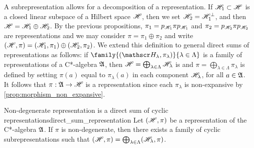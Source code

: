 A subrepresentation allows for a decomposition of a representation. If \(\mathscr{H}_1 \subset \mathscr{H}\) is a closed linear subspace of a Hilbert space \(\mathscr{H}\), then we set \(\mathscr{H}_2 = \mathscr{H}_1^{\perp}\), and then \(\mathscr{H} = \mathscr{H}_1 \oplus \mathscr{H}_2\). By the previous propositions, \(\pi_1 = p_{\mathscr{H}_1} \pi p_{\mathscr{H}_1}\) and \(\pi_2 = p_{\mathscr{H}_2} \pi p_{\mathscr{H}_2}\) are representations and we may consider \(\pi = \pi_1 \oplus \pi_2\) and write \((\mathscr{H}, \pi) = (\mathscr{H}_1, \pi_1) \oplus (\mathscr{H}_2, \pi_2)\). We extend this definition to general direct sums of representations as follows: if \(\family{(\hilbert_{\lambda}, \pi_{\lambda})}{\lambda \in \Lambda}\) is a family of representations of a C*-algebra \(\mathfrak{A}\), then \(\mathscr{H} = \bigoplus_{\lambda \in \Lambda} \mathscr{H}_{\lambda}\) is  and \(\pi = \bigoplus_{\lambda \in \Lambda} \pi_{\lambda}\) is defined by setting \(\pi(a)\) equal to \(\pi_{\lambda}(a)\) in each component \(\mathscr{H}_{\lambda}\), for all \(a \in \mathfrak{A}\). It follows that \(\pi : \mathfrak{A} \to \mathscr{H}\) is a representation since each \(\pi_{\lambda}\) is non-expansive by \cref{prop:morphism_non_expansive}.
\begin{proposition}{Non-degenerate representation is a direct sum of cyclic representations}{direct_sum_representation}
    Let \((\mathscr{H}, \pi)\) be a representation of the C*-algebra \(\mathfrak{A}\). If \(\pi\) is non-degenerate, then there exists a family of cyclic subrepresentations \family{(\hilbert_{\lambda}, \pi_{\lambda})}{\lambda \in \Lambda} such that \((\mathscr{H}, \pi) = \bigoplus_{\lambda \in \Lambda}(\mathscr{H}_{\lambda}, \pi)\).
\end{proposition}
